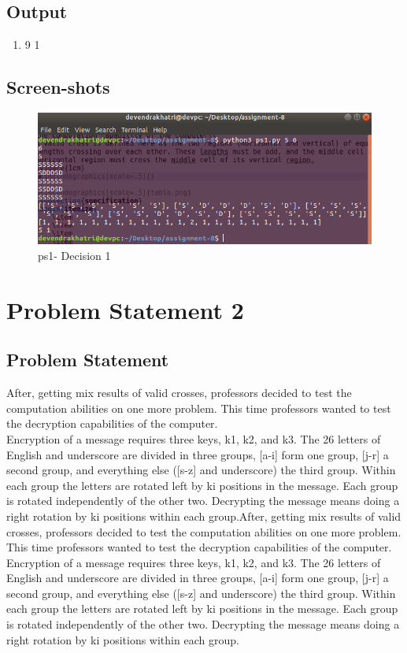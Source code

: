 \documentclass[a4paper,12pt]{article}
\begin{document}
\subsection{Output}
\begin{enumerate}
    \item 9 1
\end{enumerate}



\subsection{Screen-shots}
\begin{figure}[h]
\includegraphics[scale=0.5]{PS1.png}
\caption{ps1- Decision 1}
\label{fig:ps1in}
\end{figure}





\newpage
\section{Problem Statement 2}
\subsection{Problem Statement}
\cite{problem2}
After, getting mix results of valid crosses, professors decided to test the computation abilities on one more problem. This time professors wanted to test the decryption capabilities of the computer.\\
Encryption of  a message requires three keys, k1, k2, and k3. The 26 letters of English and underscore are divided in three groups,  [a-i] form one group, [j-r] a second group, and everything else ([s-z] and underscore) the third group. Within each group the letters are rotated left by ki positions in the message. Each group is rotated independently of the other two. Decrypting the message means doing a right rotation by ki positions within each group.After, getting mix results of valid crosses, professors decided to test the computation abilities on one more problem. This time professors wanted to test the decryption capabilities of the computer.
Encryption of  a message requires three keys, k1, k2, and k3. The 26 letters of English and underscore are divided in three groups,  [a-i] form one group, [j-r] a second group, and everything else ([s-z] and underscore) the third group. Within each group the letters are rotated left by ki positions in the message. Each group is rotated independently of the other two. Decrypting the message means doing a right rotation by ki positions within each group.
\end{document}
